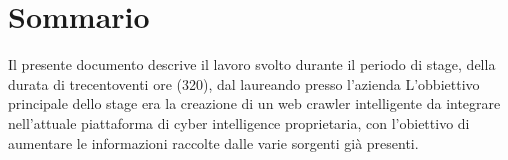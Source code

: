
\cleardoublepage
{}
{}
\begingroup
\let\clearpage\relax
\let\cleardoublepage\relax
\let\cleardoublepage\relax

\chapter*{Sommario}

Il presente documento descrive il lavoro svolto durante il periodo di stage, della durata di trecentoventi ore (320), dal laureando \myName{} presso l'azienda \myCompany{} \myCompanyRag{}
L'obbiettivo principale dello stage era la creazione di un web crawler intelligente da integrare nell’attuale piattaforma
di cyber intelligence proprietaria, con l’obiettivo di aumentare le informazioni raccolte dalle varie
sorgenti già presenti.

%
%

\endgroup			

\vfill

